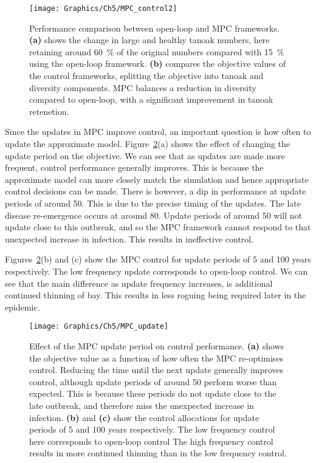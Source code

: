 \begin{figure}[t]
    \begin{center}
        \texttt{[image: Graphics/Ch5/MPC\_control2]}
        \caption[MPC strategy performance]{Performance comparison between open-loop and MPC frameworks. \textbf{(a)} shows the change in large and healthy tanoak numbers, here retaining around \SI{60}{\percent} of the original numbers compared with \SI{15}{\percent} using the open-loop framework. \textbf{(b)} compares the objective values of the control frameworks, splitting the objective into tanoak and diversity components. MPC balances a reduction in diversity compared to open-loop, with a significant improvement in tanoak retenetion.\label{fig:ch5:mpc_performance}}
    \end{center}
\end{figure}

Since the updates in MPC improve control, an important question is how often to update the approximate model. Figure~\ref{fig:ch5:mpc_update}(a) shows the effect of changing the update period on the objective. We can see that as updates are made more frequent, control performance generally improves. This is because the approximate model can more closely match the simulation and hence appropriate control decisions can be made. There is however, a dip in performance at update periods of around \SI{50}{\years}. This is due to the precise timing of the updates. The late disease re-emergence occurs at around \SI{80}{\years}. Update periods of around \SI{50}{\years} will not update close to this outbreak, and so the MPC framework cannot respond to that unexpected increase in infection. This results in ineffective control.

Figures~\ref{fig:ch5:mpc_update}(b) and (c) show the MPC control for update periods of 5 and 100 years respectively. The low frequency update corresponds to open-loop control. We can see that the main difference as update frequency increases, is additional continued thinning of bay. This results in less roguing being required later in the epidemic.

\begin{figure}
    \begin{center}
        \texttt{[image: Graphics/Ch5/MPC\_update]}
        \caption[Effect of MPC update period]{Effect of the MPC update period on control performance. \textbf{(a)} shows the objective value as a function of how often the MPC re-optimises control. Reducing the time until the next update generally improves control, although update periods of around \SI{50}{\years} perform worse than expected. This is because these periods do not update close to the late outbreak, and therefore miss the unexpected increase in infection. \textbf{(b)} and \textbf{(c)} show the control allocations for update periods of 5 and 100 years respectively. The low frequency control here corresponds to open-loop control The high frequency control results in more continued thinning than in the low frequency control.\label{fig:ch5:mpc_update}}
    \end{center}
\end{figure}

